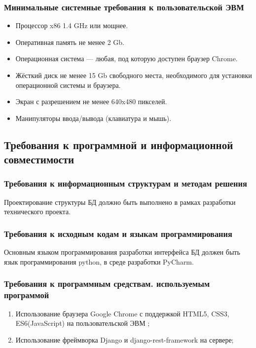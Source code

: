     \subsubsection{Минимальные системные требования к пользовательской ЭВМ}
      \begin{itemize}
        \item Процессор x86 1.4 GHz или мощнее.
        \item Оперативная память не менее 2 Gb.
        \item Операционная система — любая, под которую доступен браузер Chrome.
        \item Жёсткий диск не менее 15 Gb свободного места, необходимого для установки операционной системы и браузера.
        \item Экран с разрешением не менее 640x480 пикселей.
        \item Манипуляторы ввода/вывода (клавиатура и мышь).
      \end{itemize}
  \subsection{Требования к программной и информационной совместимости}
    \subsubsection{Требования к информационным структурам и методам решения}
      Проектирование структуры БД должно быть выполнено в рамках разработки технического проекта.
    \subsubsection{Требования к исходным кодам и языкам программирования}
      Основным языком программирования разработки интерфейса БД должен быть язык программирования python, в среде разработки PyCharm.
    \subsubsection{Требования к программным средствам. используемым программой}
    \begin{enumerate}
      \item Использование браузера Google Chrome с поддержкой HTML5, CSS3, ES6(JavaScript) на пользовательской ЭВМ ;
      \item Использование фреймворка Django и django-rest-framework на сервере; 
    \end{enumerate}
